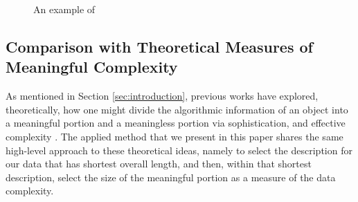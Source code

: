 \documentclass[a4paper,fleqn]{cas-sc}
\theoremstyle{remark}
\begin{document}
\begin{figure}
    \centering
    \caption{An example of }
    \label{fig:golf-balls-segmented}
\end{figure}
\subsection{Comparison with Theoretical Measures of Meaningful Complexity} \label{subsec:comparison-to-theoretical}
As mentioned in Section \ref{sec:introduction}, previous works have explored, theoretically, how one might divide the algorithmic information of an object into a meaningful portion and a meaningless portion via sophistication, \citep{vitanyi2006meaningful,koppel1987complexity} and effective complexity \citep{ay2010effective,gell1996information}. The applied method that we present in this paper shares the same high-level approach to these theoretical ideas, namely to select the description for our data that has shortest overall length, and then, within that shortest description, select the size of the meaningful portion as a measure of the data complexity. 
\end{document}
